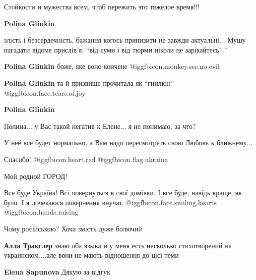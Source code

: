 \begin{itemize}
\begin{itemize}
Стойкости и мужества всем, чтоб пережить это тяжелое время!!!

\textbf{Polina Glinkin}, 

злість і безсердечність, бажання когось принизити не завжди актуальні... Мушу
нагадати відоме прислів'я: \enquote{від суми і від тюрми ніколи не зарікайтесь!..}

\textbf{Polina Glinkin} боже, яке воно кончене @igg{fbicon.monkey.see.no.evil} 

\textbf{Polina Glinkin} та й призвище прочитала як \enquote{гнилкін} @igg{fbicon.face.tears.of.joy} 

\textbf{Polina Glinkin} 

Полина... у Вас такой негатив к Елене... я не понимаю, за что?

У неё все будет нормально, а Вам надо пересмотреть свою Любовь к ближнему...

\end{itemize} %

Спасибо! @igg{fbicon.heart.red} @igg{fbicon.flag.ukraina}

Мой родной ГОРОД!

Все буде Україна! Всі повернуться в свої домівки. І все буде, навідь краще, як було. І я дочекаюся повернення внучат. @igg{fbicon.face.smiling.hearts}  @igg{fbicon.hands.raising} 

Чому російською? Хоча змість дуже болючий

\begin{itemize} %
\textbf{Алла Тракслер} знаю оба языка и у меня есть несколько стихотворений на украинском....але вони не мають відношення до цієї теми

\textbf{Elena Sapunova} Дякую за відгук
\end{itemize} %

\end{itemize} %
